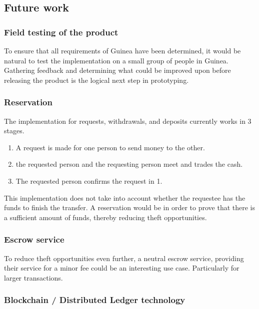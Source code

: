 \documentclass[11pt, a4paper]{article}
\begin{document}
\subsection{Future work} %
\label{sub:future_work}

\subsubsection{Field testing of the product} %
\label{sub:field_testing_of_the_product}
To ensure that all requirements of Guinea have been determined, it would be natural to test the implementation on a small group of people in Guinea. Gathering feedback and determining what could be improved upon before releasing the product is the logical next step in prototyping.

\subsubsection{Reservation} %
\label{sub:reservation}
The implementation for requests, withdrawals, and deposits currently works in 3 stages.
\begin{enumerate}
  \item A request is made for one person to send money to the other.
  \item the requested person and the requesting person meet and trades the cash.
  \item The requested person confirms the request in 1.
\end{enumerate}
This implementation does not take into account whether the requestee has the funds to finish the transfer. A reservation would be in order to prove that there is a sufficient amount of funds, thereby reducing theft opportunities.

\subsubsection{Escrow service}
To reduce theft opportunities even further, a neutral escrow service, providing their service for a minor fee could be an interesting use case. Particularly for larger transactions.

\subsubsection{Blockchain / Distributed Ledger technology} %
\end{document}
